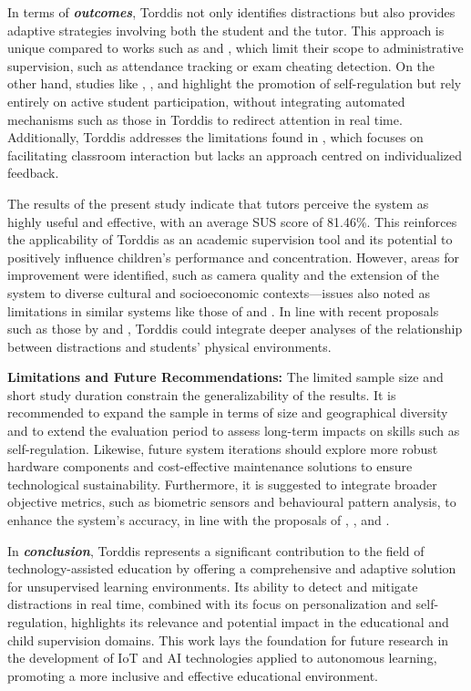                 In terms of \textbf{\textit{outcomes}}, Torddis not only identifies distractions but also provides adaptive strategies involving both the student and the tutor. This approach is unique compared to works such as \cite{James2019} and \cite{Ozdamli2022}, which limit their scope to administrative supervision, such as attendance tracking or exam cheating detection. On the other hand, studies like \cite{Palmer2022impact}, \cite{Muljana2022Instructional}, and \cite{Hartley2022Smartphone} highlight the promotion of self-regulation but rely entirely on active student participation, without integrating automated mechanisms such as those in Torddis to redirect attention in real time. Additionally, Torddis addresses the limitations found in \cite{Erazo2016Easing}, which focuses on facilitating classroom interaction but lacks an approach centred on individualized feedback.
                
                The results of the present study indicate that tutors perceive the system as highly useful and effective, with an average SUS score of 81.46\%. This reinforces the applicability of Torddis as an academic supervision tool and its potential to positively influence children's performance and concentration. However, areas for improvement were identified, such as camera quality and the extension of the system to diverse cultural and socioeconomic contexts—issues also noted as limitations in similar systems like those of \cite{Bembich2016Future} and \cite{Muljana2022Instructional}. In line with recent proposals such as those by \cite{Narkhede2023} and \cite{Ucar2022Recognizing}, Torddis could integrate deeper analyses of the relationship between distractions and students' physical environments.
                
                \textbf{Limitations and Future Recommendations:} The limited sample size and short study duration constrain the generalizability of the results. It is recommended to expand the sample in terms of size and geographical diversity and to extend the evaluation period to assess long-term impacts on skills such as self-regulation. Likewise, future system iterations should explore more robust hardware components and cost-effective maintenance solutions to ensure technological sustainability. Furthermore, it is suggested to integrate broader objective metrics, such as biometric sensors and behavioural pattern analysis, to enhance the system’s accuracy, in line with the proposals of \cite{VilliersRader2021}, \cite{Hachad2020}, and \cite{Ozdamli2022}.
                
                In \textbf{\textit{conclusion}}, Torddis represents a significant contribution to the field of technology-assisted education by offering a comprehensive and adaptive solution for unsupervised learning environments. Its ability to detect and mitigate distractions in real time, combined with its focus on personalization and self-regulation, highlights its relevance and potential impact in the educational and child supervision domains. This work lays the foundation for future research in the development of IoT and AI technologies applied to autonomous learning, promoting a more inclusive and effective educational environment.
                    			
